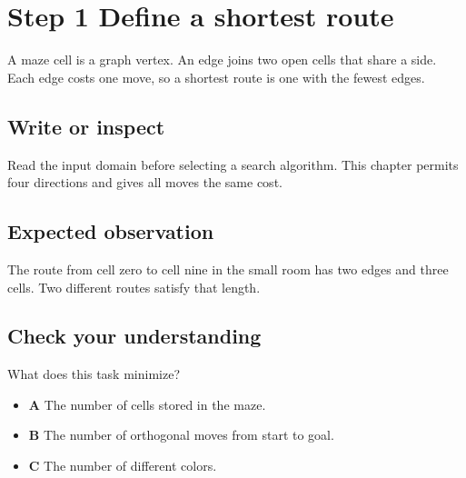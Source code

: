 \section{Step 1 Define a shortest route}\label{maze-s01}

A maze cell is a graph vertex. An edge joins two open cells that share a side. Each edge costs one move, so a shortest route is one with the fewest edges.

\subsection{Write or inspect}

Read the input domain before selecting a search algorithm. This chapter permits four directions and gives all moves the same cost.

\subsection{Expected observation}

The route from cell zero to cell nine in the small room has two edges and three cells. Two different routes satisfy that length.

\subsection{Check your understanding}

What does this task minimize?

\begin{itemize}
  \item \textbf{A} The number of cells stored in the maze.
  \item \textbf{B} The number of orthogonal moves from start to goal.
  \item \textbf{C} The number of different colors.
\end{itemize}
